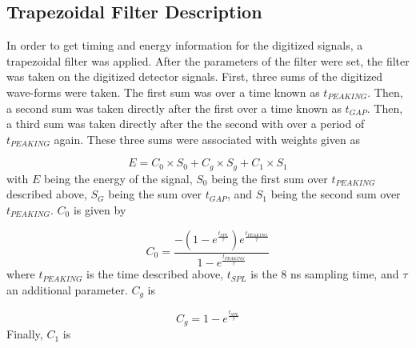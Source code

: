 \documentclass[../MaxHughesThesis.tex]{subfiles}
\begin{document}
\subsection{Trapezoidal Filter Description}
In order to get timing and energy information for the digitized signals, a trapezoidal filter was applied.
After the parameters of the filter were set, the filter was taken on the digitized detector signals.
First, three sums of the digitized wave-forms were taken.
The first sum was over a time known as $t_{PEAKING}$.
Then, a second sum was taken directly after the first over a time known as $t_{GAP}$.
Then, a third sum was taken directly after the the second with over a period of $t_{PEAKING}$ again.
These three sums were associated with weights given as \cite{Tan03} 

\begin{equation}
	E = C_{0} \times S_{0} + C_{g} \times S_{g} + C_{1} \times S_{1} 
	\label{eq:ensum}
\end{equation} 
%
with $E$ being the energy of the signal, $S_{0}$ being the first sum over $t_{PEAKING}$ described above, $S_{G}$ being the sum over $t_{GAP}$, and $S_{1}$ being the second sum over $t_{PEAKING}$.
$C_{0}$ is given by 

\begin{equation}
	C_{0} = \frac{-(1 - e^{\frac{t_{SPL}}{\tau}})e^{\frac{t_{PEAKING}}{\tau}}}{1 - e^{\frac{t_{PEAKING}}{\tau}}}
	\label{eq:c0sum}
\end{equation}
%
where $t_{PEAKING}$ is the time described above, $t_{SPL}$ is the 8 ns sampling time, and $\tau$ an additional parameter.
$C_{g}$ is 

\begin{equation}
	C_{g} = 1 - e^{\frac{t_{SPL}}{\tau}}
	\label{eq:cgsum}
\end{equation}
%
Finally, $C_{1}$ is 
\end{document}
